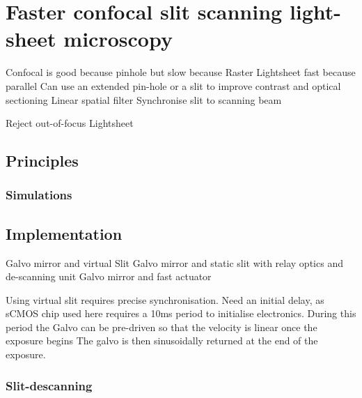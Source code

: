 \ifpdf
    \graphicspath{{Chapters/dualslit/Figs/Raster/}{Chapters/dualslit/Figs/PDF/}{Chapters/dualslit/Figs/}}
\else
    \graphicspath{{Chapters/dualslit/Figs/Vector/}{Chapters/dualslit/Figs/}}
\fi

\chapter{Faster confocal slit scanning light-sheet microscopy}

Confocal is good because pinhole but slow because Raster
Lightsheet fast because parallel
Can use an extended pin-hole or a slit to improve contrast and optical sectioning
Linear spatial filter
Synchronise slit to scanning beam

Reject out-of-focus Lightsheet


\section{Principles}



\subsection{Simulations}
\section{Implementation}

Galvo mirror and virtual Slit
Galvo mirror and static slit with relay optics and de-scanning unit
Galvo mirror and fast actuator

Using virtual slit requires precise synchronisation.
Need an initial delay, as sCMOS chip used here requires a 10ms period to initialise electronics.
During this period the Galvo can be pre-driven so that the velocity is linear once the exposure begins
The galvo is then sinusoidally returned at the end of the exposure.

\subsection{Slit-descanning} %
